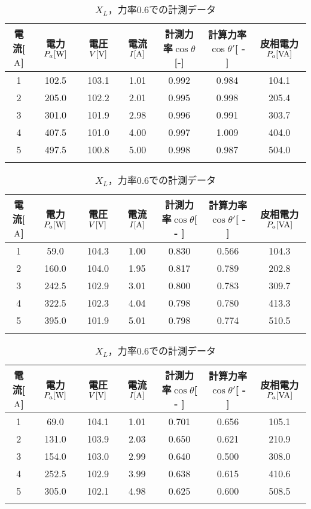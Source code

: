 \begin{table}[h]
	\centering
	\caption{$X_{L}$，力率$1.0$での計測データ}
	\label{tab:1data}
\begin{tabular}{ccccccc}
	\hline
	電流[$\rm{A}$] & 電力$P_a[\rm{W}]$ & 電圧$V[\rm{V}]$ & 電流$I[\rm{A}]$ & 計測力率$\cos \theta$[\rm{-}]  & 計算力率$\cos \theta '$[ - ]  & 皮相電力$P_a[\rm{VA}]$ \\ \hline
	1      & 102.5   & 103.1   & 1.01  & 0.992 & 0.984 & 104.1   \\
	2      & 205.0   & 102.2   & 2.01  & 0.995 & 0.998 & 205.4   \\
	3      & 301.0   & 101.9   & 2.98  & 0.996 & 0.991 & 303.7   \\
	4      & 407.5   & 101.0   & 4.00  & 0.997 & 1.009 & 404.0   \\
	5      & 497.5   & 100.8   & 5.00  & 0.998 & 0.987 & 504.0     \\ \hline\\
\end{tabular}
	\caption{$X_{L}$，力率$0.8$での計測データ}
	\label{tab:0.8data}
\begin{tabular}{ccccccc}
	\hline
	電流[$\rm{A}$] & 電力$P_a[\rm{W}]$ & 電圧$V[\rm{V}]$ & 電流$I[\rm{A}]$ & 計測力率$\cos \theta$[ - ] & 計算力率$\cos \theta '$[ - ] & 皮相電力$P_a[\rm{VA}]$ \\ \hline
	1 & 59.0  & 104.3 & 1.00 & 0.830 & 0.566 & 104.3 \\
	2 & 160.0 & 104.0 & 1.95 & 0.817 & 0.789 & 202.8 \\
	3 & 242.5 & 102.9 & 3.01 & 0.800 & 0.783 & 309.7 \\
	4 & 322.5 & 102.3 & 4.04 & 0.798 & 0.780 & 413.3 \\
	5 & 395.0 & 101.9 & 5.01 & 0.798 & 0.774 & 510.5 \\ \hline\\
\end{tabular}
	\caption{$X_{L}$，力率$0.6$での計測データ}
	\label{tab:0.6data}
\begin{tabular}{ccccccc}
	\hline
	電流[$\rm{A}$] & 電力$P_a[\rm{W}]$ & 電圧$V[\rm{V}]$ & 電流$I[\rm{A}]$ & 計測力率$\cos \theta$[ - ] & 計算力率$\cos \theta '$[ - ] & 皮相電力$P_a[\rm{VA}]$ \\ \hline
	1 & 69.0  & 104.1 & 1.01 & 0.701 & 0.656 & 105.1 \\
	2 & 131.0 & 103.9 & 2.03 & 0.650 & 0.621 & 210.9 \\
	3 & 154.0 & 103.0 & 2.99 & 0.640 & 0.500 & 308.0 \\
	4 & 252.5 & 102.9 & 3.99 & 0.638 & 0.615 & 410.6 \\
	5 & 305.0 & 102.1 & 4.98 & 0.625 & 0.600 & 508.5 \\ \hline\\
\end{tabular}
\end{table}
